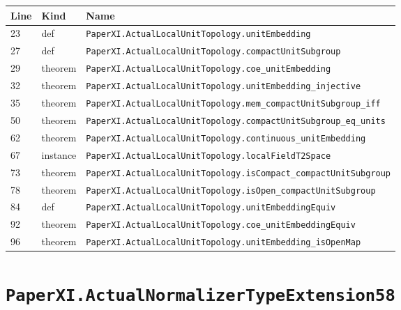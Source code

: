 \documentclass[10pt,oneside]{book}
\begin{document}
\begin{longtable}{@{}p{}p{}p{}@{}}\toprule Line&Kind&Name\\\midrule\endhead

23&def&\nolinkurl{PaperXI.ActualLocalUnitTopology.unitEmbedding}\\

27&def&\nolinkurl{PaperXI.ActualLocalUnitTopology.compactUnitSubgroup}\\

29&theorem&\nolinkurl{PaperXI.ActualLocalUnitTopology.coe_unitEmbedding}\\

32&theorem&\nolinkurl{PaperXI.ActualLocalUnitTopology.unitEmbedding_injective}\\

35&theorem&\nolinkurl{PaperXI.ActualLocalUnitTopology.mem_compactUnitSubgroup_iff}\\

50&theorem&\nolinkurl{PaperXI.ActualLocalUnitTopology.compactUnitSubgroup_eq_units}\\

62&theorem&\nolinkurl{PaperXI.ActualLocalUnitTopology.continuous_unitEmbedding}\\

67&instance&\nolinkurl{PaperXI.ActualLocalUnitTopology.localFieldT2Space}\\

73&theorem&\nolinkurl{PaperXI.ActualLocalUnitTopology.isCompact_compactUnitSubgroup}\\

78&theorem&\nolinkurl{PaperXI.ActualLocalUnitTopology.isOpen_compactUnitSubgroup}\\

84&def&\nolinkurl{PaperXI.ActualLocalUnitTopology.unitEmbeddingEquiv}\\

92&theorem&\nolinkurl{PaperXI.ActualLocalUnitTopology.coe_unitEmbeddingEquiv}\\

96&theorem&\nolinkurl{PaperXI.ActualLocalUnitTopology.unitEmbedding_isOpenMap}\\

\bottomrule\end{longtable}

\section{\texorpdfstring{\nolinkurl{PaperXI.ActualNormalizerTypeExtension58}}{PaperXI.ActualNormalizerTypeExtension58}}\label{module:PaperXI.ActualNormalizerTypeExtension58}
\end{document}
